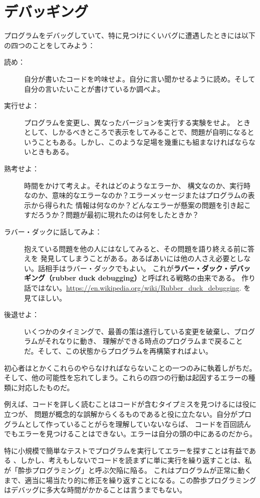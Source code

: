 \documentclass[a4j,12pt,makeidx]{jbook}
\begin{document}
\section{デバッギング}
プログラムをデバッグしていて、特に見つけにくいバグに遭遇したときには以下の四つのことをしてみよう：
\begin{description}
\item [読め：] 自分が書いたコードを吟味せよ。自分に言い聞かせるように読め。そして自分の言いたいことが書けているか調べよ。
\item [実行せよ：] プログラムを変更し、異なったバージョンを実行する実験をせよ。
ときとして、しかるべきところで表示をしてみることで、問題が自明になるということもある。しかし、このような足場を幾重にも組まなければならないときもある。
\item [熟考せよ：] 時間をかけて考えよ。それはどのようなエラーか、
構文なのか、実行時なのか、意味的なエラーなのか？エラーメッセージまたはプログラムの表示から得られた
情報は何なのか？どんなエラーが懸案の問題を引き起こすだろうか？問題が最初に現れたのは何をしたときか？
\item [ラバー・ダックに話してみよ：] 抱えている問題を他の人にはなしてみると、その問題を語り終える前に答えを
発見してしまうことがある。あるばあいには他の人さえ必要としない。話相手はラバー・ダックでもよい。
これが{\bf ラバー・ダック・デバッギング（rubber duck debugging）}と呼ばれる戦略の由来である。
作り話ではない。\url{https://en.wikipedia.org/wiki/Rubber_duck_debugging}.
を見てほしい。
\item [後退せよ：] いくつかのタイミングで、最善の策は進行している変更を破棄し、プログラムがそれなりに動き、
理解ができる時点のプログラムまで戻ることだ。そして、この状態からプログラムを再構築すればよい。
\end{description}
初心者はとかくこれらのやらなければならないことの一つのみに執着しがちだ。
そして、他の可能性を忘れてしまう。これらの四つの行動は起因するエラーの種類に対応したものだ。 \par
例えば、コードを詳しく読むことはコードが含むタイプミスを見つけるには役に立つが、
問題が概念的な誤解からくるものであると役に立たない。自分がプログラムとして作っていることがらを理解していないならば、
コードを百回読んでもエラーを見つけることはできない。エラーは自分の頭の中にあるのだから。\par
特に小規模で簡単なテストでプログラムを実行してエラーを探すことは有益である
、しかし、考えもしないでコードを読まずに単に実行を繰り返すことは、私が「酔歩プログラミング」と呼ぶ欠陥に陥る。
これはプログラムが正常に動くまで、適当に場当たり的に修正を繰り返すことになる。この酔歩プログラミングはデバッグに多大な時間がかかることは言うまでもない。
\end{document}

